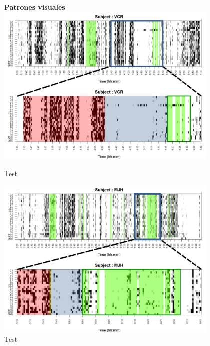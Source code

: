 \begin{figure}
\Large{\textbf{Patrones visuales}}\\
\includegraphics[width=0.95\textwidth]
{./img_ejemplos/zoom_VCR.pdf}
\caption{Test}
\label{test1}
\end{figure}

\begin{figure}
\includegraphics[width=0.95\textwidth]
{./img_ejemplos/zoom_MJH.pdf}
\caption{Test}
\label{test2}
\end{figure}

